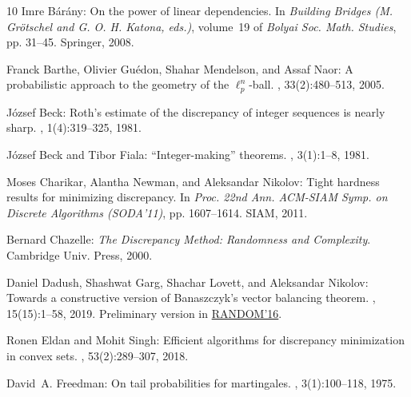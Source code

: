 \documentclass[11pt]{article}
\numberwithin{equation}{section}
\theoremstyle{definition}
\theoremstyle{plain}
\begin{document}
\begin{thebibliography}{10}
{\sc Imre B{\'a}r{\'a}ny}: On the power of linear dependencies.
\newblock In {\em Building Bridges {\rm (M. Gr{\"o}tschel and G. O. H. Katona,
  eds.)}}, volume~19 of {\em Bolyai Soc. Math. Studies}, pp. 31--45. Springer,
  2008.
\newblock [\epfmtdoi{10.1007/978-3-540-85221-6\_1}]

{\sc Franck Barthe, Olivier Gu\'{e}don, Shahar Mendelson, and Assaf Naor}: A
  probabilistic approach to the geometry of the $\ell_p^n$-ball.
, 33(2):480--513, 2005.
\newblock [\epfmtdoi{10.1214/009117904000000874}]

{\sc J{\'o}zsef Beck}: Roth's estimate of the discrepancy of integer sequences
  is nearly sharp.
, 1(4):319--325, 1981.
\newblock [\epfmtdoi{10.1007/BF02579452}]

{\sc J\'{o}zsef Beck and Tibor Fiala}: ``{I}nteger-making'' theorems.
, 3(1):1--8, 1981.
\newblock [\epfmtdoi{10.1016/0166-218X(81)90022-6}]

{\sc Moses Charikar, Alantha Newman, and Aleksandar Nikolov}: Tight hardness
  results for minimizing discrepancy.
\newblock In {\em Proc. 22nd Ann. ACM-SIAM Symp. on Discrete Algorithms
  (SODA'11)}, pp. 1607--1614. SIAM, 2011.
\newblock [\epfmtdoi{10.1137/1.9781611973082.124}]

{\sc Bernard Chazelle}: {\em The Discrepancy Method: Randomness and
  Complexity}.
\newblock Cambridge Univ. Press, 2000.

{\sc Daniel Dadush, Shashwat Garg, Shachar Lovett, and Aleksandar Nikolov}:
  Towards a constructive version of {B}anaszczyk's vector balancing theorem.
, 15(15):1--58, 2019.
\newblock Preliminary version in
  \href{http://doi.org/10.4230/LIPIcs.APPROX-RANDOM.2016.28}{RANDOM'16}.

{\sc Ronen Eldan and Mohit Singh}: Efficient algorithms for discrepancy
  minimization in convex sets.
, 53(2):289--307, 2018.

{\sc David~A. Freedman}: On tail probabilities for martingales.
, 3(1):100--118, 1975.


\end{thebibliography}
\end{document}
